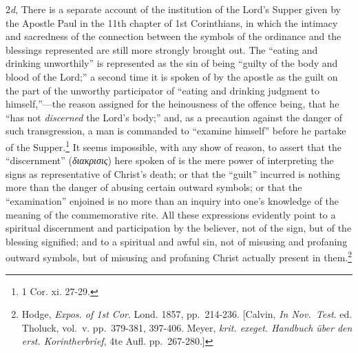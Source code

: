\documentclass[english,]{book}
\begin{document}
2\emph{d}, There is a separate account of the institution of the Lord's Supper given by the Apostle Paul in the 11th chapter of 1st Corinthians, in which the intimacy and sacredness of the connection between the symbols of the ordinance and the blessings represented are still more strongly brought out. The ``eating and drinking unworthily'' is represented as the sin of being ``guilty of the body and blood of the Lord;'' a second time it is spoken of by the apostle as the guilt on the part of the unworthy participator of ``eating and drinking judgment to himself,''---the reason assigned for the heinousness of the offence being, that he ``has not \emph{discerned} the Lord's body;'' and, as a precaution against the danger of such transgression, a man is commanded to ``examine himself'' before he partake of the Supper.\footnote{1 Cor. xi. 27-29.} It seems impossible, with any show of reason, to assert that the ``discernment'' (\emph{διακρισις}) here spoken of is the mere power of interpreting the signs as representative of Christ's death; or that the ``guilt'' incurred is nothing more than the danger of abusing certain outward symbols; or that the ``examination'' enjoined is no more than an inquiry into one's knowledge of the meaning of the commemorative rite. All these expressions evidently point to a spiritual discernment and participation by the believer, not of the sign, but of the blessing signified; and to a spiritual and awful sin, not of misusing and profaning outward symbols, but of misusing and profaning Christ actually present in them.\footnote{Hodge, \emph{Expos. of 1st Cor}. Lond. 1857, pp.~214-236. {[}Calvin, \emph{In Nov.~Test}. ed. Tholuck, vol.~v. pp.~379-381, 397-406. Meyer, \emph{krit. exeget. Handbuch über den erst. Korintherbrief}, 4te Aufl. pp.~267-280.{]}}
\end{document}
